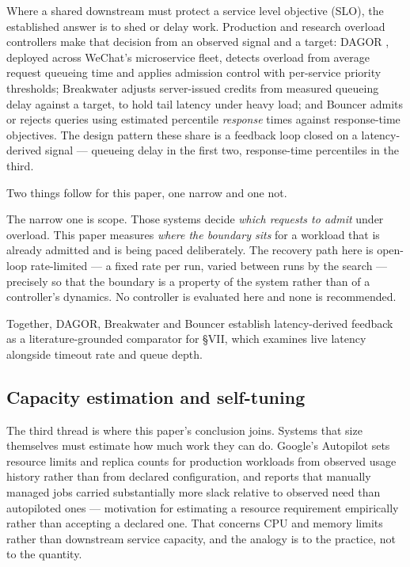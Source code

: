 \documentclass{ieeeaccess}
\begin{document}
Where a shared downstream must protect a service level objective (SLO), the established answer is to shed or delay work. Production and research overload controllers make that decision from an observed signal and a target: DAGOR \cite{dagor}, deployed across WeChat's microservice fleet, detects overload from average request queueing time and applies admission control with per-service priority thresholds; Breakwater \cite{breakwater} adjusts server-issued credits from measured queueing delay against a target, to hold tail latency under heavy load; and Bouncer \cite{bouncer} admits or rejects queries using estimated percentile \textit{response} times against response-time objectives. The design pattern these share is a feedback loop closed on a latency-derived signal --- queueing delay in the first two, response-time percentiles in the third.

Two things follow for this paper, one narrow and one not.

The narrow one is scope. Those systems decide \textit{which requests to admit} under overload. This paper measures \textit{where the boundary sits} for a workload that is already admitted and is being paced deliberately. The recovery path here is open-loop rate-limited --- a fixed rate per run, varied between runs by the search --- precisely so that the boundary is a property of the system rather than of a controller's dynamics. No controller is evaluated here and none is recommended.

Together, DAGOR, Breakwater and Bouncer establish latency-derived feedback as a literature-grounded comparator for \S{}VII, which examines live latency alongside timeout rate and queue depth.

\subsection{Capacity estimation and self-tuning}

The third thread is where this paper's conclusion joins. Systems that size themselves must estimate how much work they can do. Google's Autopilot \cite{autopilot} sets resource limits and replica counts for production workloads from observed usage history rather than from declared configuration, and reports that manually managed jobs carried substantially more slack relative to observed need than autopiloted ones --- motivation for estimating a resource requirement empirically rather than accepting a declared one. That concerns CPU and memory limits rather than downstream service capacity, and the analogy is to the practice, not to the quantity.
\end{document}
